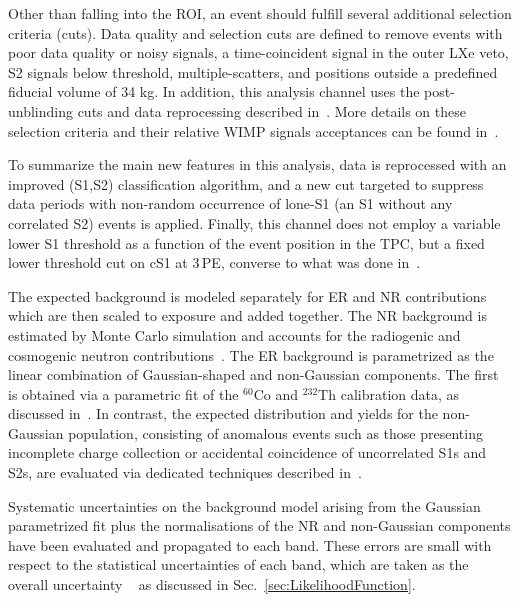 Other than falling into the ROI, an event should fulfill several additional selection criteria (cuts). Data quality and selection cuts are defined to remove events with poor data quality or noisy signals, a time-coincident signal in the outer LXe veto, S2 signals below threshold, multiple-scatters, and positions outside a predefined fiducial volume of 34 kg. In addition, this analysis channel uses the post-unblinding cuts and data reprocessing described in~\cite{xe100_run_combination}. More details on these selection criteria and their relative WIMP signals acceptances can be found in~\cite{Aprile:2012vw,xe100_run_combination}. 


To summarize the main new features in this analysis, data is reprocessed with an improved (S1,S2) classification algorithm, and a new cut targeted to suppress data periods with non-random occurrence of lone-S1 (an S1 without 
any correlated S2) events is applied. 
Finally, this channel does not employ a variable lower S1 threshold as a function of the event position in the TPC, but a fixed 
lower threshold cut on cS1 at 3\,PE, converse to what was done in~\cite{xe100_run_combination}.

The expected background is modeled separately for ER and NR contributions which are then scaled to exposure and added together.
The NR background is estimated by Monte Carlo simulation and accounts for the radiogenic and cosmogenic neutron
contributions~\cite{Aprile:2013tov}.
The ER background is parametrized as the linear combination of Gaussian-shaped and non-Gaussian components.
The first is obtained via a parametric fit of the $^{60}$Co and $^{232}$Th calibration data, as discussed in~\cite{xe100_run10_si}.
In contrast, the expected distribution and yields for the non-Gaussian population, consisting of anomalous events such as those 
presenting incomplete charge collection or accidental coincidence of uncorrelated S1s and S2s,  
are evaluated via dedicated techniques described in~\cite{xe100_run_combination}.

Systematic uncertainties on the background model arising from the Gaussian parametrized fit plus the normalisations of the NR and non-Gaussian components have been evaluated and propagated to each band. These errors are small with respect to the statistical uncertainties of each band, which are taken as the overall uncertainty ~\cite{xe100_run_combination} as discussed in Sec.~\ref{sec:LikelihoodFunction}.

